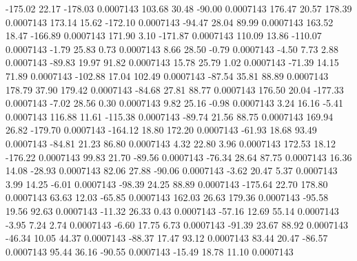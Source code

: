      -175.02       22.17     -178.03     0.0007143
      103.68       30.48      -90.00     0.0007143
      176.47       20.57      178.39     0.0007143
      173.14       15.62     -172.10     0.0007143
      -94.47       28.04       89.99     0.0007143
      163.52       18.47     -166.89     0.0007143
      171.90        3.10     -171.87     0.0007143
      110.09       13.86     -110.07     0.0007143
       -1.79       25.83        0.73     0.0007143
        8.66       28.50       -0.79     0.0007143
       -4.50        7.73        2.88     0.0007143
      -89.83       19.97       91.82     0.0007143
       15.78       25.79        1.02     0.0007143
      -71.39       14.15       71.89     0.0007143
     -102.88       17.04      102.49     0.0007143
      -87.54       35.81       88.89     0.0007143
      178.79       37.90      179.42     0.0007143
      -84.68       27.81       88.77     0.0007143
      176.50       20.04     -177.33     0.0007143
       -7.02       28.56        0.30     0.0007143
        9.82       25.16       -0.98     0.0007143
        3.24       16.16       -5.41     0.0007143
      116.88       11.61     -115.38     0.0007143
      -89.74       21.56       88.75     0.0007143
      169.94       26.82     -179.70     0.0007143
     -164.12       18.80      172.20     0.0007143
      -61.93       18.68       93.49     0.0007143
      -84.81       21.23       86.80     0.0007143
        4.32       22.80        3.96     0.0007143
      172.53       18.12     -176.22     0.0007143
       99.83       21.70      -89.56     0.0007143
      -76.34       28.64       87.75     0.0007143
       16.36       14.08      -28.93     0.0007143
       82.06       27.88      -90.06     0.0007143
       -3.62       20.47        5.37     0.0007143
        3.99       14.25       -6.01     0.0007143
      -98.39       24.25       88.89     0.0007143
     -175.64       22.70      178.80     0.0007143
       63.63       12.03      -65.85     0.0007143
      162.03       26.63      179.36     0.0007143
      -95.58       19.56       92.63     0.0007143
      -11.32       26.33        0.43     0.0007143
      -57.16       12.69       55.14     0.0007143
       -3.95        7.24        2.74     0.0007143
       -6.60       17.75        6.73     0.0007143
      -91.39       23.67       88.92     0.0007143
      -46.34       10.05       44.37     0.0007143
      -88.37       17.47       93.12     0.0007143
       83.44       20.47      -86.57     0.0007143
       95.44       36.16      -90.55     0.0007143
      -15.49       18.78       11.10     0.0007143
